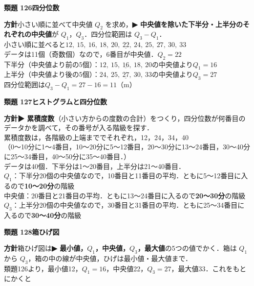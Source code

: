 \documentclass[a4paper,11pt]{ltjsarticle}
\newcommand{\ans}[2]{\Needspace{5\baselineskip}\vspace{6pt}%
  {\sffamily\bfseries 類題 #1\quad #2}\par}
\newcommand{\point}[1]{\textsf{\bfseries ▶ #1}}
\begin{document}
\ans{126}{四分位数}
\begin{kai}
\textbf{方針}\quad 小さい順に並べて中央値 $Q_2$ を求め，\point{中央値を除いた下半分・上半分のそれぞれの中央値}が $Q_1$，$Q_3$．四分位範囲は $Q_3-Q_1$．\\[2pt]
小さい順に並べると\quad $12,\ 15,\ 16,\ 18,\ 20,\ \underline{22},\ 24,\ 25,\ 27,\ 30,\ 33$\\
データは11個（奇数個）なので，6番目が中央値．\quad $Q_2=22$\\[2pt]
下半分（中央値より前の5個）：$12,\ 15,\ \underline{16},\ 18,\ 20$\quad の中央値より\quad $Q_1=16$\\
上半分（中央値より後の5個）：$24,\ 25,\ \underline{27},\ 30,\ 33$\quad の中央値より\quad $Q_3=27$\\[2pt]
四分位範囲は\quad $Q_3-Q_1=27-16=11$（m）
\end{kai}

\ans{127}{ヒストグラムと四分位数}
\begin{kai}
\textbf{方針}\quad \point{累積度数}（小さい方からの度数の合計）をつくり，四分位数が何番目のデータかを調べて，その番号が入る階級を探す．\\[2pt]
累積度数は，各階級の上端まででそれぞれ，12，24，34，40\\
（0〜10分に1〜4番目，10〜20分に5〜12番目，20〜30分に13〜24番目，30〜40分に25〜34番目，40〜50分に35〜40番目．）\\[2pt]
データは40個．下半分は1〜20番目，上半分は21〜40番目．\\
$Q_1$：下半分20個の中央値なので，10番目と11番目の平均．ともに5〜12番目に入るので\quad \textbf{10〜20分}の階級\\
中央値：20番目と21番目の平均．ともに13〜24番目に入るので\quad \textbf{20〜30分}の階級\\
$Q_3$：上半分20個の中央値なので，30番目と31番目の平均．ともに25〜34番目に入るので\quad \textbf{30〜40分}の階級
\end{kai}

\ans{128}{箱ひげ図}
\begin{kai}
\textbf{方針}\quad 箱ひげ図は\point{最小値，$Q_1$，中央値，$Q_3$，最大値}の5つの値でかく．箱は $Q_1$ から $Q_3$，箱の中の線が中央値，ひげは最小値・最大値まで．\\[2pt]
類題126より，最小値12，$Q_1=16$，中央値22，$Q_3=27$，最大値33．これをもとにかくと\\[4pt]
\end{kai}
\end{document}
